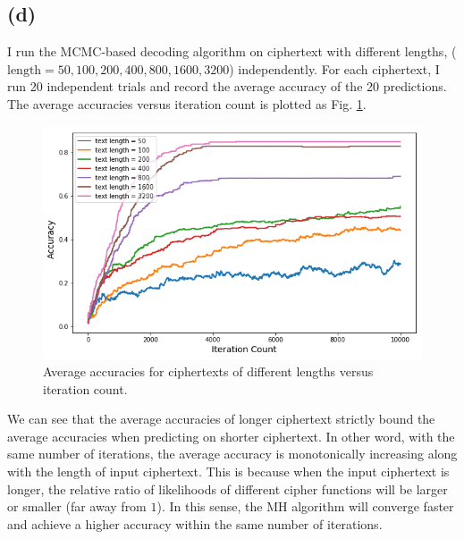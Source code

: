 \documentclass[12pt]{article}
\begin{document}
\subsection{(d)}
I run the MCMC-based decoding algorithm on ciphertext with different lengths, ($\text{length}=50, 100, 200, 400, 800, 1600, 3200$) independently. For each ciphertext, I run 20 independent trials and record the average accuracy of the 20 predictions. The average accuracies versus iteration count is plotted as Fig. \ref{fig:text-length}.
\begin{figure}[H]
	\centering
	\includegraphics[width=0.9\linewidth]{pics/text-length.png}
	\caption{Average accuracies for ciphertexts of different lengths versus iteration count.}
	\label{fig:text-length}
\end{figure}
We can see that the average accuracies of longer ciphertext strictly bound the average accuracies when predicting on shorter ciphertext. In other word, with the same number of iterations, the average accuracy is monotonically increasing along with the length of input ciphertext. This is because when the input ciphertext is longer, the relative ratio of likelihoods of different cipher functions will be larger or smaller (far away from $1$). In this sense, the MH algorithm will converge faster and achieve a higher accuracy within the same number of iterations.
\end{document}
